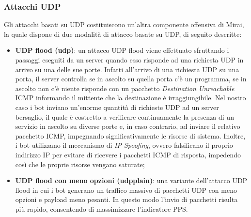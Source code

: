 \subsubsection{Attacchi UDP}
Gli attacchi basati su UDP costituiscono un'altra componente offensiva di Mirai, la quale dispone di due modalità di attacco basate su UDP, di seguito descritte:
\begin{itemize}
    \item \textbf{UDP flood (udp)}: un attacco UDP flood viene effettuato sfruttando i passaggi eseguiti da un server quando esso risponde ad una richiesta UDP in arrivo su una delle sue porte. Infatti all'arrivo di una richiesta UDP su una porta, il server controlla se in ascolto su quella porta c'è un programma, se in ascolto non c'è niente risponde con un pacchetto \emph{Destination Unreachable} ICMP  informando il mittente che la destinazione è irraggiungibile. Nel nostro caso i bot inviano un'enorme quantità di richieste UDP ad un server bersaglio, il quale è costretto a verificare continuamente la presenza di un servizio in ascolto su diverse porte e, in caso contrario, ad inviare il relativo pacchetto ICMP, impegnando significativamente le risorse di sistema. 
    Inoltre, i bot utilizzano il meccanismo di \emph{IP Spoofing}, ovvero falsificano il proprio indirizzo IP per evitare di ricevere i pacchetti ICMP di risposta, impedendo così che le proprie risorse vengano saturate;
    \item \textbf{UDP flood con meno opzioni (udpplain)}: una variante dell'attacco UDP flood in cui i bot generano un traffico massivo di pacchetti UDP con meno opzioni e payload meno pesanti. In questo modo l'invio di pacchetti risulta più rapido, consentendo di massimizzare l'indicatore PPS.
\end{itemize}
